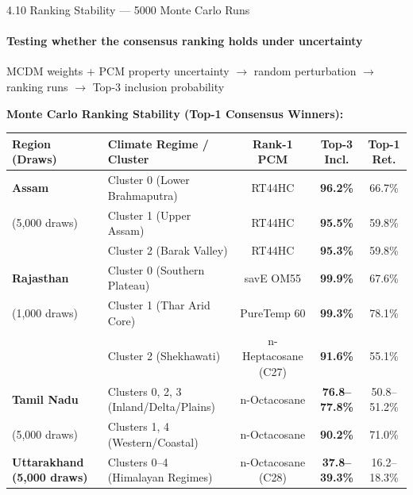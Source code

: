 \documentclass[aspectratio=169, 11pt]{beamer}
\begin{document}
\begin{frame}{4.10 Ranking Stability --- 5000 Monte Carlo Runs}
\framesubtitle{Testing whether the consensus ranking holds under uncertainty}

\footnotesize
MCDM weights + PCM property uncertainty $\to$ random perturbation $\to$ ranking runs $\to$ Top-3 inclusion probability \cite{Chopra2023MonteCarloETC}

\vspace{0.15cm}
\textbf{Monte Carlo Ranking Stability (Top-1 Consensus Winners):}
\vspace{0.1cm}

\begin{table}[H]
\centering
\scriptsize
\setlength{\tabcolsep}{4pt}
\renewcommand{\arraystretch}{1.15}
\begin{tabular}{llccc}
\hline
\textbf{Region (Draws)} & \textbf{Climate Regime / Cluster} & \textbf{Rank-1 PCM} & \textbf{Top-3 Incl.} & \textbf{Top-1 Ret.} \\
\hline
\textbf{Assam} & Cluster 0 (Lower Brahmaputra) & RT44HC & \textbf{96.2\%} & 66.7\% \\
(5,000 draws)  & Cluster 1 (Upper Assam)       & RT44HC & \textbf{95.5\%} & 59.8\% \\
               & Cluster 2 (Barak Valley)      & RT44HC & \textbf{95.3\%} & 59.8\% \\
\hline
\textbf{Rajasthan} & Cluster 0 (Southern Plateau)  & savE\textregistered{} OM55  & \textbf{99.9\%} & 67.6\% \\
(1,000 draws)      & Cluster 1 (Thar Arid Core)    & PureTemp 60                  & \textbf{99.3\%} & 78.1\% \\
                   & Cluster 2 (Shekhawati)        & n-Heptacosane (C27)          & \textbf{91.6\%} & 55.1\% \\
\hline
\textbf{Tamil Nadu} & Clusters 0, 2, 3 (Inland/Delta/Plains) & n-Octacosane & \textbf{76.8--77.8\%} & 50.8--51.2\% \\
(5,000 draws)       & Clusters 1, 4 (Western/Coastal)       & n-Octacosane & \textbf{90.2\%}       & 71.0\% \\
\hline
\textbf{Uttarakhand (5,000 draws)} & Clusters 0--4 (Himalayan Regimes) & n-Octacosane (C28) & \textbf{37.8--39.3\%} & 16.2--18.3\% \\
\hline
\end{tabular}
\end{table}

\end{frame}
\end{document}
